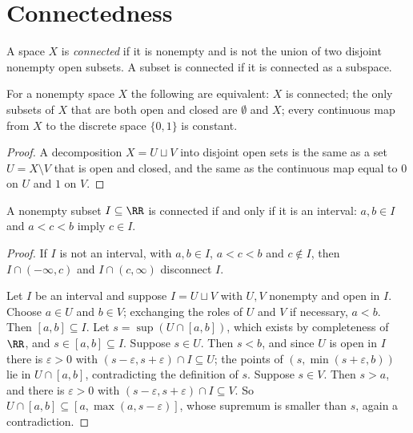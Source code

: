 \section{Connectedness}\label{general-topology:section-connectedness}

\begin{definition}\label{general-topology:definition-connected}
A space $X$ is \emph{connected} if it is nonempty and is not the union of two disjoint nonempty open subsets. A subset is connected if it is
connected as a subspace.
\end{definition}

\begin{lemma}\label{general-topology:lemma-connected-criteria}
For a nonempty space $X$ the following are equivalent: $X$ is connected; the only subsets of $X$ that are both open and closed are $\emptyset$ and
$X$; every continuous map from $X$ to the discrete space $\{0, 1\}$ is constant.
\end{lemma}

\begin{proof}
A decomposition $X = U \sqcup V$ into disjoint open sets is the same as a set $U = X \setminus V$ that is open and closed, and the same as the
continuous map equal to $0$ on $U$ and $1$ on $V$.
\end{proof}

\begin{theorem}\label{general-topology:theorem-intervals-connected}
A nonempty subset $I \subseteq \RR$ is connected if and only if it is an interval: $a, b \in I$ and $a < c < b$ imply $c \in I$.
\end{theorem}

\begin{proof}
If $I$ is not an interval, with $a, b \in I$, $a < c < b$ and $c \notin I$, then $I \cap (-\infty, c)$ and $I \cap (c, \infty)$ disconnect $I$.

Let $I$ be an interval and suppose $I = U \sqcup V$ with $U, V$ nonempty and open in $I$. Choose $a \in U$ and $b \in V$; exchanging the roles of $U$ and
$V$ if necessary, $a < b$. Then $[a, b] \subseteq I$. Let $s = \sup(U \cap [a, b])$, which exists by completeness of $\RR$, and $s \in [a, b] \subseteq I$.
Suppose $s \in U$. Then $s < b$, and since $U$ is open in $I$ there is $\varepsilon > 0$ with $(s - \varepsilon, s + \varepsilon) \cap I \subseteq U$; the
points of $(s, \min(s + \varepsilon, b))$ lie in $U \cap [a, b]$, contradicting the definition of $s$. Suppose $s \in V$. Then $s > a$, and there is
$\varepsilon > 0$ with $(s - \varepsilon, s + \varepsilon) \cap I \subseteq V$. So $U \cap [a, b] \subseteq [a, \max(a, s - \varepsilon)]$, whose supremum is
smaller than $s$, again a contradiction.
\end{proof}

